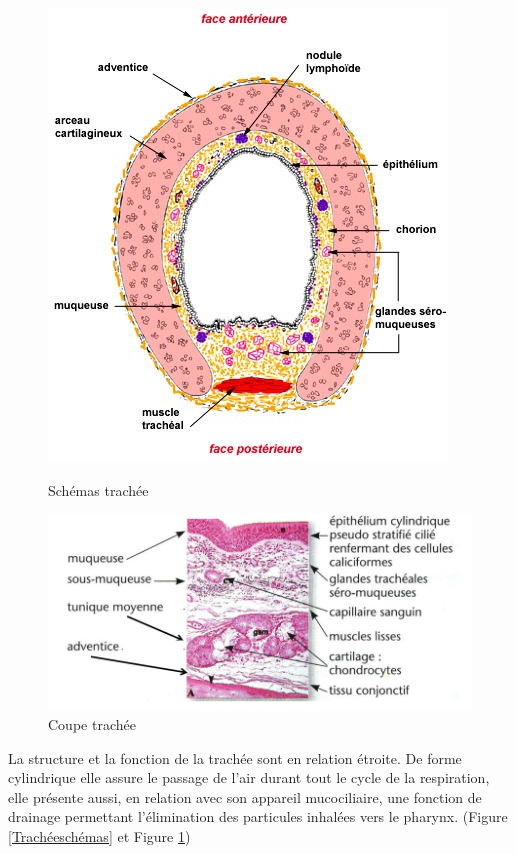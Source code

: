 \begin{figure}[h!]
    \begin{minipage}[b]{0.4\linewidth}
        \centering \includegraphics[scale=0.4]{gfx/Trach_esch_mas.jpg}
        \centering \caption{Schémas trachée}
        \label{Trachéeschémas}
    \end{minipage}\hfill
    \begin{minipage}[b]{0.7\linewidth}
        \centering \includegraphics[scale=0.4]{gfx/Trach_ecoupe.jpg}
        \centering \caption{Coupe trachée}
        \label{Trachéecoupe}
    \end{minipage}
\end{figure}

La structure et la fonction de la trachée sont en relation étroite. De forme cylindrique elle assure le passage de l'air durant tout le cycle de la respiration, elle présente aussi, en relation avec son appareil mucociliaire, une fonction de drainage permettant l'élimination des particules inhalées vers le pharynx. (Figure \ref{Trachéeschémas} et Figure \ref{Trachéecoupe})



